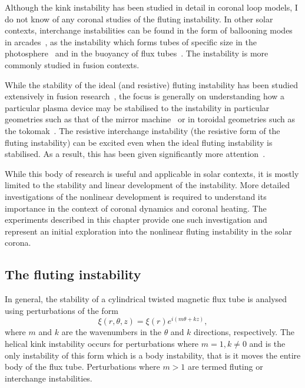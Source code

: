 Although the kink instability has been studied in detail in coronal loop models, I do not know of any coronal studies of the fluting instability. In other solar contexts, interchange instabilities can be found in the form of ballooning modes in arcades~\cite{hoodBallooningInstabilitiesSolar1986}, as the instability which forms tubes of specific size in the photosphere~\cite{bunteInterchangeInstabilitySolar1993} and in the buoyancy of flux tubes~\cite{schuesslerInterchangeInstabilitySmall1984}. The instability is more commonly studied in fusion contexts.

While the stability of the ideal (and resistive) fluting instability has been studied extensively in fusion research~\cite{mikhailovskiiInstabilitiesConfinedPlasma1998,zhengAdvancedTokamakStability2015,wessonHydromagneticStabilityTokamaks1978}, the focus is generally on understanding how a particular plasma device may be stabilised to the instability in particular geometries such as that of the mirror machine~\cite{jungwirthTheoryFluteInstability1965} or in toroidal geometries such as the tokomak~\cite{shafranovFluteInstabilityCurrentcarrying1968}. The resistive interchange instability (the resistive form of the fluting instability) can be excited even when the ideal fluting instability is stabilised. As a result, this has been given significantly more attention~\cite{johnsonResistiveInterchangesNegativeV1967,correa-restrepoResistiveBallooningModes1983}.

While this body of research is useful and applicable in solar contexts, it is mostly limited to the stability and linear development of the instability. More detailed investigations of the nonlinear development is required to understand its importance in the context of coronal dynamics and coronal heating. The experiments described in this chapter provide one such investigation and represent an initial exploration into the nonlinear fluting instability in the solar corona.

\subsection{The fluting instability}

In general, the stability of a cylindrical twisted magnetic flux tube is analysed using perturbations of the form
\begin{equation}
  \label{eq:kink_perturbation}
\xi(r, \theta, z) = \xi(r) e^{i(m\theta + kz)},
\end{equation}
where $m$ and $k$ are the wavenumbers in the $\theta$ and $k$ directions, respectively. The helical kink instability occurs for perturbations where $m=1, k\ne0$ and is the only instability of this form which is a body instability, that is it moves the entire body of the flux tube. Perturbations where $m>1$ are termed fluting or interchange instabilities.

